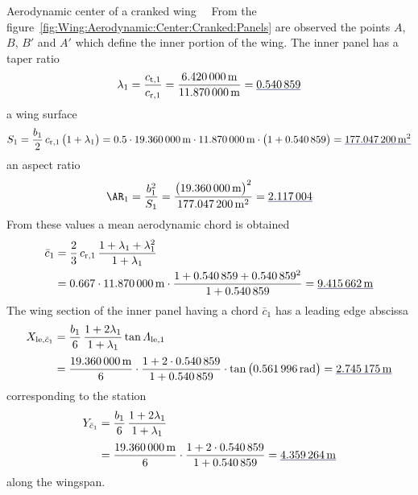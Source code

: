 \documentclass[[12pt,twoside]{book}
\begin{document}
\begin{myExampleX}{Aerodynamic center of a cranked wing}{\ \myIconGraph\ }
From the figure~\ref{fig:Wing:Aerodynamic:Center:Cranked:Panels} are observed
the points $A$, $B$, $B'$ and $A'$ which define the inner portion of the wing.
The inner panel has a taper ratio
\[
\lambda_1
  =\frac{c_{\mathrm{t},1}}{c_{\mathrm{r},1}}
  =\frac{\SI[round-precision=2]{\myChordTipWingIMT}{\metre}}{\SI[round-precision=2]{\myChordRootWingIMT}{\metre}}
  =\mathunderline{mydarkblue}{ \SI[round-precision=2]{\myTaperRatioWingI}{} }
\]
a wing surface
\[
S_1 = \frac{b_1}{2} \, c_{\mathrm{r},1} \, \big( 1 + \lambda_1 \big)
  =
    \num{0.5} \cdot \SI[round-precision=1]{\mySpanWingIMT}{\metre}
      \cdot \SI[round-precision=2]{\myChordRootWingIMT}{\metre}
      \cdot \big( 1 + \SI[round-precision=2]{\myTaperRatioWingI}{} \big) 
    = \mathunderline{mydarkblue}{ \SI[round-precision=1]{\myAreaWingIMTsquared}{\metre^2} }
\]
an aspect ratio
\[
\AR_1 
  = \frac{b_1^2}{S_1}
  = \frac{\big(\SI[round-precision=1]{\mySpanWingIMT}{\metre}\big)^2}{\SI[round-precision=1]{\myAreaWingIMTsquared}{\metre^2}}
  = \mathunderline{mydarkblue}{ \num[round-precision=2]{\myAspectRatioWingI} }
\]
From these values a mean aerodynamic chord is obtained
\[
\begin{split}
\bar{c}_1 & {}= \frac{2}{3} \, c_{\mathrm{r},1} \, \frac{1+\lambda_1 + \lambda_1^2}{1+\lambda_1} \\
  & {}=
    \num{0.667} \cdot \SI[round-precision=2]{\myChordRootWingIMT}{\metre}
      \cdot 
        \frac{
          1 + \SI[round-precision=2]{\myTaperRatioWingI}{} + \SI[round-precision=2]{\myTaperRatioWingI}{}^2
        }{
          1 + \SI[round-precision=2]{\myTaperRatioWingI}{}
        }
    = \mathunderline{mydarkblue}{ \SI[round-precision=2]{\myMACWingIMT}{\metre} }
\end{split}
\]
The wing section of the inner panel having a chord $\bar{c}_1$ has a leading edge
abscissa
\[
\begin{split}
X_{\mathrm{le},\bar{c}_1} 
  & {}=
    \frac{b_1}{6} \, \frac{1+2\lambda_1}{1+\lambda_1} \tan\Lambda_\mathrm{le,1} \\[3pt]
  & {}=
    \frac{\SI[round-precision=1]{\mySpanWingIMT}{\metre}}{6}
      \cdot 
      \frac{
        1 + 2\cdot\SI[round-precision=2]{\myTaperRatioWingI}{}
      }{
        1 + \SI[round-precision=2]{\myTaperRatioWingI}{}
      }
      \cdot \tan \big( \SI[round-precision=3]{\mySweepLEWingIRAD}{\radian} \big)
    = \mathunderline{mydarkblue}{ \SI[round-precision=2]{\myXMACLEToApexWingIMT}{\metre} }
\end{split}
\]
corresponding to the station
\[
\begin{split}
Y_{\bar{c}_1} 
  & {}=
    \frac{b_1}{6} \, \frac{1+2\lambda_1}{1+\lambda_1} \\[3pt]
  & {}=
    \frac{\SI[round-precision=1]{\mySpanWingIMT}{\metre}}{6}
      \cdot 
      \frac{
        1 + 2\cdot\SI[round-precision=2]{\myTaperRatioWingI}{}
      }{
        1 + \SI[round-precision=2]{\myTaperRatioWingI}{}
      }
    = \mathunderline{mydarkblue}{ \SI[round-precision=2]{\myYMACWingIMT}{\metre} }
\end{split}
\]
along the wingspan.


\end{myExampleX}
\end{document}
